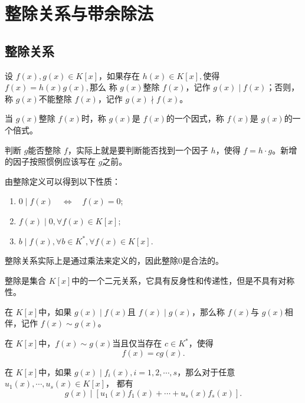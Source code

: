 \section{整除关系与带余除法}
\subsection{整除关系}
\begin{mydef}[整除]
    设 $f(x),g(x)\in K[x]$，如果存在 $h(x)\in K[x],$使得 $f(x)=h(x)g(x),$那么
    称 $g(x)$整除 $f(x)$，记作 $g(x)\mid f(x)$；否则，称 $g(x)$不能整除 $f(x)$，记作 $g(x)\nmid f(x)$。
\end{mydef}
    当 $g(x)$整除 $f(x)$时，称 $g(x)$是 $f(x)$的一个因式，称 $f(x)$是 $g(x)$的一个倍式。
\begin{myrmk}
    判断 $g$能否整除 $f$，实际上就是要判断能否找到一个因子 $h$，使得 $f=h\cdot g$。新增的因子按照惯例应该写在 $g$之前。
\end{myrmk}
由整除定义可以得到以下性质：
\begin{myproperty}
\begin{enumerate}
\item $0\mid f(x)\phantom{11}\Longleftrightarrow\phantom{11}f(x)=0$;
\item $f(x)\mid 0,\forall f(x)\in K[x];$
\item $b\mid f(x),\forall b\in K^*,\forall f(x)\in K[x].$
\end{enumerate}
\end{myproperty}
\begin{myrmk}
    整除关系实际上是通过乘法来定义的，因此整除0是合法的。
\end{myrmk}
\begin{myrmk}
    整除是集合 $K[x]$中的一个二元关系，它具有反身性和传递性，但是不具有对称性。
\end{myrmk}
\begin{mydef}[相伴]
    在 $K[x]$中，如果 $g(x)\mid f(x)$且 $f(x)\mid g(x)$，那么称 $f(x)$与 $g(x)$相伴，记作 $f(x)\sim g(x)$。
\end{mydef}
\begin{myprop}
    在 $K[x]$中，$f(x)\sim g(x)$当且仅当存在 $c\in K^*$，使得
    \[f(x)=cg(x).\]
\end{myprop}
\begin{myprop}
    在 $K[x]$中，如果 $g(x)\mid f_i(x),i=1,2,\cdots,s$，那么对于任意 $u_1(x),\cdots,u_s(x)\in K[x]$，
    都有 
    \[g(x)\mid [u_1(x)f_1(x)+\cdots+u_s(x)f_s(x)].\]
\end{myprop}
